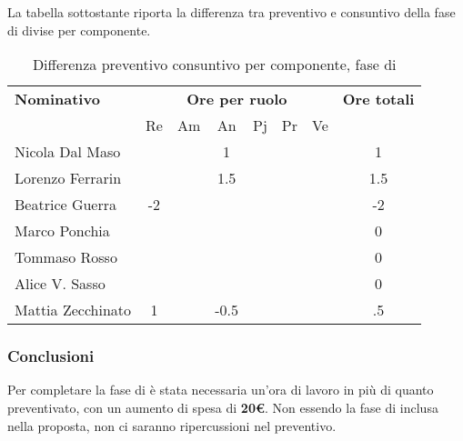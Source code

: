 La tabella sottostante riporta la differenza tra preventivo e consuntivo della fase di \AR divise per componente.
\begin{table}[H]
	\centering
	\begin{tabular}{|l|c|c|c|c|c|c|c|}
		\hline
		\textbf{Nominativo} & 
		\multicolumn{6}{c|}{\textbf{Ore per ruolo}} & 
		\textbf{Ore totali} \\
		& Re & Am & An & Pj & Pr & Ve & \\
		\hline
		Nicola Dal Maso & & &1 & & & & 1 \\
		Lorenzo Ferrarin & & &1.5 & & & & 1.5 \\
		Beatrice Guerra & -2 & & & & & & -2 \\
		Marco Ponchia & & & & & & & 0 \\
		Tommaso Rosso & & & & & & & 0 \\
		Alice V. Sasso & & & & & & & 0 \\
		Mattia Zecchinato & 1& &-0.5 & & & & .5  \\
		\hline
	\end{tabular}
	\caption{Differenza preventivo consuntivo per componente, fase di \AR}
\end{table}
\subsubsection{Conclusioni}
Per completare la fase di \AR è stata necessaria un'ora di lavoro in più di quanto preventivato, con un aumento di spesa di \textbf{20€}. Non essendo la fase di \AR inclusa nella proposta, non ci saranno ripercussioni nel preventivo.


